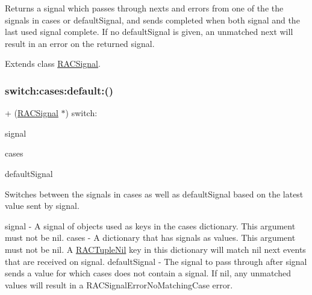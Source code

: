 Returns a signal which passes through {\ttfamily next}s and {\ttfamily error}s from one of the the signals in {\ttfamily cases} or {\ttfamily default\+Signal}, and sends {\ttfamily completed} when both {\ttfamily signal} and the last used signal complete. If no {\ttfamily default\+Signal} is given, an unmatched {\ttfamily next} will result in an error on the returned signal. 

Extends class \mbox{\hyperlink{interface_r_a_c_signal_aac7816b22cfdcbe65cd43d99836ba1f5}{R\+A\+C\+Signal}}.

\mbox{\label{category_r_a_c_signal_07_operations_08_aac7816b22cfdcbe65cd43d99836ba1f5}} 
\subsubsection{\texorpdfstring{switch\+:cases\+:default\+:()}{switch:cases:default:()}\hspace{0.1cm}{\footnotesize\ttfamily [3/3]}}
{\footnotesize\ttfamily + (\mbox{\hyperlink{interface_r_a_c_signal}{R\+A\+C\+Signal}} $\ast$) switch\+: \begin{DoxyParamCaption}\item[{(\mbox{\hyperlink{interface_r_a_c_signal}{R\+A\+C\+Signal}} $\ast$)}]{signal }\item[{cases:(N\+S\+Dictionary $\ast$)}]{cases }\item[{default:(\mbox{\hyperlink{interface_r_a_c_signal}{R\+A\+C\+Signal}} $\ast$)}]{default\+Signal }\end{DoxyParamCaption}}

Switches between the signals in {\ttfamily cases} as well as {\ttfamily default\+Signal} based on the latest value sent by {\ttfamily signal}.

signal -\/ A signal of objects used as keys in the {\ttfamily cases} dictionary. This argument must not be nil. cases -\/ A dictionary that has signals as values. This argument must not be nil. A \mbox{\hyperlink{interface_r_a_c_tuple_nil}{R\+A\+C\+Tuple\+Nil}} key in this dictionary will match nil {\ttfamily next} events that are received on {\ttfamily signal}. default\+Signal -\/ The signal to pass through after {\ttfamily signal} sends a value for which {\ttfamily cases} does not contain a signal. If nil, any unmatched values will result in a R\+A\+C\+Signal\+Error\+No\+Matching\+Case error.

